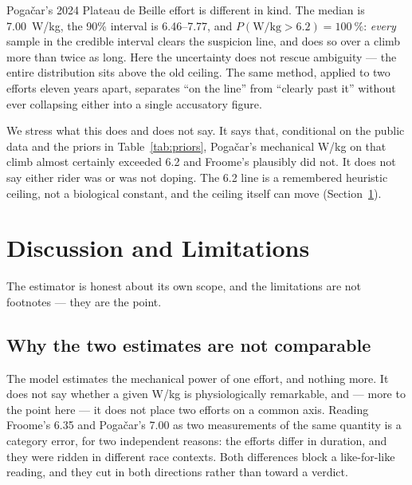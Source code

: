 \documentclass[11pt]{article}
\begin{document}
Pogačar's 2024 Plateau de Beille effort is different in kind. The median is
\num{7.00}~W/kg, the 90\% interval is \numrange{6.46}{7.77}, and
$P(\text{W/kg}>6.2)=\SI{100}{\percent}$: \emph{every} sample in the credible
interval clears the suspicion line, and does so over a climb more than twice as
long. Here the uncertainty does not rescue ambiguity --- the entire distribution
sits above the old ceiling. The same method, applied to two efforts eleven years
apart, separates ``on the line'' from ``clearly past it'' without ever collapsing
either into a single accusatory figure.

We stress what this does and does not say. It says that, conditional on the
public data and the priors in Table~\ref{tab:priors}, Pogačar's mechanical W/kg
on that climb almost certainly exceeded \num{6.2} and Froome's plausibly did not.
It does not say either rider was or was not doping. The \num{6.2} line is a
remembered heuristic ceiling, not a biological constant, and the ceiling itself
can move (Section~\ref{sec:discussion}).

\section{Discussion and Limitations}
\label{sec:discussion}

The estimator is honest about its own scope, and the limitations are not
footnotes --- they are the point.

\subsection{Why the two estimates are not comparable}
\label{sec:context}

The model estimates the mechanical power of one effort, and nothing more. It does
not say whether a given W/kg is physiologically remarkable, and --- more to the
point here --- it does not place two efforts on a common axis. Reading Froome's
\num{6.35} and Pogačar's \num{7.00} as two measurements of the same quantity is a
category error, for two independent reasons: the efforts differ in duration, and
they were ridden in different race contexts. Both differences block a like-for-like
reading, and they cut in both directions rather than toward a verdict.
\end{document}

